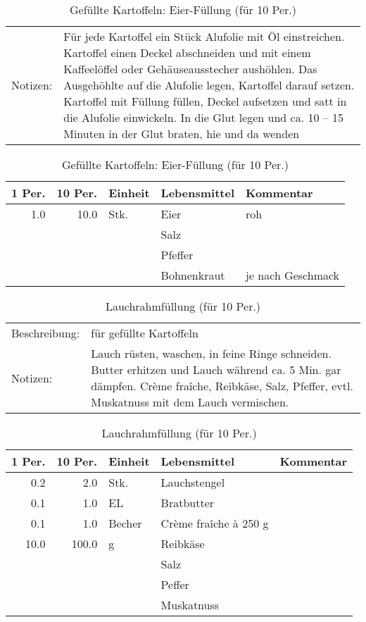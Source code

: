 \documentclass[11pt,a4paper]{article}%
\begin{document}
%
\vspace{0.75cm}%
\renewcommand{\arraystretch}{1.25}%


\begin{table}[h]%
\caption{Gefüllte Kartoffeln: Eier{-}Füllung (für 10 Per.)}%
\begin{tabularx}{\textwidth}{l X}%
Notizen:&Für jede Kartoffel ein Stück Alufolie mit Öl einstreichen. Kartoffel einen Deckel abschneiden und mit einem Kaffeelöffel oder Gehäuseausstecher aushöhlen. Das Ausgehöhlte auf die Alufolie legen, Kartoffel darauf setzen. Kartoffel mit Füllung füllen, Deckel aufsetzen und satt in die Alufolie einwickeln. In die Glut legen und ca. 10 – 15 Minuten in der Glut braten, hie und da wenden \\%
\end{tabularx}%
\par%
\begin{tabularx}{\textwidth}{| r | r | l | l | X |}%
\hline%
\tiny{1 Per.}&\tiny{10 Per.}&\tiny{Einheit}&\tiny{Lebensmittel}&\tiny{Kommentar}\\%
\hline%
1.0&10.0&Stk.&Eier&roh\\%
\hline%
&&&Salz&\\%
\hline%
&&&Pfeffer&\\%
\hline%
&&&Bohnenkraut&je nach Geschmack\\%
\hline%
\end{tabularx}%
\end{table}

%
\vspace{0.75cm}%
\renewcommand{\arraystretch}{1.25}%


\begin{table}[h]%
\caption{Lauchrahmfüllung (für 10 Per.)}%
\begin{tabularx}{\textwidth}{l X}%
Beschreibung: &für gefüllte Kartoffeln\\%
Notizen:&Lauch rüsten, waschen, in feine Ringe schneiden. Butter erhitzen und Lauch während ca. 5 Min. gar dämpfen. Crème fraîche, Reibkäse, Salz, Pfeffer, evtl. Muskatnuss mit dem Lauch vermischen.\\%
\end{tabularx}%
\par%
\begin{tabularx}{\textwidth}{| r | r | l | l | X |}%
\hline%
\tiny{1 Per.}&\tiny{10 Per.}&\tiny{Einheit}&\tiny{Lebensmittel}&\tiny{Kommentar}\\%
\hline%
0.2&2.0&Stk.&Lauchstengel&\\%
\hline%
0.1&1.0&EL&Bratbutter&\\%
\hline%
0.1&1.0&Becher&Crème fraîche à 250 g&\\%
\hline%
10.0&100.0&g&Reibkäse&\\%
\hline%
&&&Salz&\\%
\hline%
&&&Peffer&\\%
\hline%
&&&Muskatnuss&\\%
\hline%
\end{tabularx}%
\end{table}

%
\clearpage%
\pagebreak%
\newpage%
\end{document}

